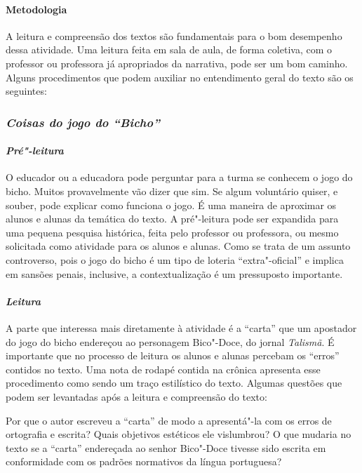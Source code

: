 \documentclass{extarticle}
\begin{document}
\paragraph{Metodologia} A leitura e compreensão dos textos são
fundamentais para o bom desempenho dessa atividade. Uma leitura feita em
sala de aula, de forma coletiva, com o professor ou professora já
apropriados da narrativa, pode ser um bom caminho. Alguns procedimentos
que podem auxiliar no entendimento geral do texto são os seguintes:



\subsubsection{\textit{Coisas do jogo do ``Bicho''}}

\paragraph{\textit{Pré"-leitura}}

O educador ou a educadora pode perguntar para a turma se conhecem o
jogo do bicho. Muitos provavelmente vão dizer que sim. Se algum
voluntário quiser, e souber, pode explicar como funciona o jogo. É uma
maneira de aproximar os alunos e alunas da temática do texto. A
pré"-leitura pode ser expandida para uma pequena pesquisa histórica,
feita pelo professor ou professora, ou mesmo solicitada como atividade
para os alunos e alunas. Como se trata de um assunto controverso, pois o
jogo do bicho é um tipo de loteria ``extra"-oficial'' e implica em
sansões penais, inclusive, a contextualização é um pressuposto
importante.

\paragraph{\textit{Leitura}}

A parte que interessa mais diretamente à atividade é a ``carta'' que um
apostador do jogo do bicho endereçou ao personagem Bico"-Doce, do jornal
\emph{Talismã}. É importante que no processo de leitura os alunos e
alunas percebam os ``erros'' contidos no texto. Uma nota de rodapé
contida na crônica apresenta esse procedimento como sendo um traço
estilístico do texto. Algumas questões que podem ser levantadas após a
leitura e compreensão do texto:

Por que o autor escreveu a ``carta'' de modo a apresentá"-la com os
erros de ortografia e escrita? Quais objetivos estéticos ele vislumbrou?
O que mudaria no texto se a ``carta'' endereçada ao senhor Bico"-Doce
tivesse sido escrita em conformidade com os padrões normativos da língua
portuguesa?
\end{document}

